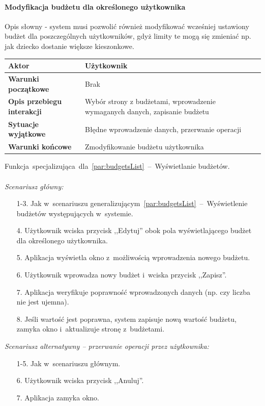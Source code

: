 \paragraph{Modyfikacja budżetu dla określonego użytkownika\newline}
\label{par:userBudgetEdit}
Opis słowny - system musi pozwolić również modyfikować wcześniej ustawiony budżet
dla poszczególnych użytkowników, gdyż limity te mogą się zmieniać np. jak dziecko
dostanie większe kieszonkowe.
\begin{longtable}{|p{5cm}|p{7cm}|}
 	\hline
	\textbf{Aktor} & Użytkownik \\
	\hline
	\textbf{Warunki początkowe} & Brak
	\\
	\hline
	\textbf{Opis przebiegu interakcji} & Wybór strony z budżetami, wprowadzenie wymaganych danych,
	zapisanie budżetu
	\\
	\hline
	\textbf{Sytuacje wyjątkowe} & Błędne wprowadzenie danych, przerwanie operacji
	\\
	\hline
	\textbf{Warunki końcowe} & Zmodyfikowanie budżetu użytkownika
	\\
	\hline
 \end{longtable}
Funkcja~specjalizująca~dla~\ref{par:budgetsList}~--~Wyświetlanie budżetów.\\\\
\textit{Scenariusz główny:}
\begin{enumerate}
  \item[1-3.] Jak w~scenariuszu generalizującym~\ref{par:budgetsList}~--~Wyświetlenie budżetów występujących w~systemie.
  \item[4.] Użytkownik wciska przycisk ,,Edytuj'' obok pola wyświetlającego budżet dla określonego użytkownika.
  \item[5.] Aplikacja wyświetla okno z~możliwością wprowadzenia nowego budżetu.
  \item[6.] Użytkownik wprowadza nowy budżet i~wciska przycisk ,,Zapisz''.
  \item[7.] Aplikacja weryfikuje poprawność wprowadzonych danych (np. czy liczba nie jest ujemna).
  \item[8.] Jeśli wartość jest poprawna, system zapisuje nową wartość budżetu, zamyka okno i~aktualizuje stronę z~budżetami.
\end{enumerate}
\textit{Scenariusz alternatywny -- przerwanie operacji przez użytkownika:}
\begin{enumerate}
  \item[1-5.] Jak w~scenariuszu głównym.
  \item[6.] Użytkownik wciska przycisk ,,Anuluj''.
  \item[7.] Aplikacja zamyka okno.
\end{enumerate}
